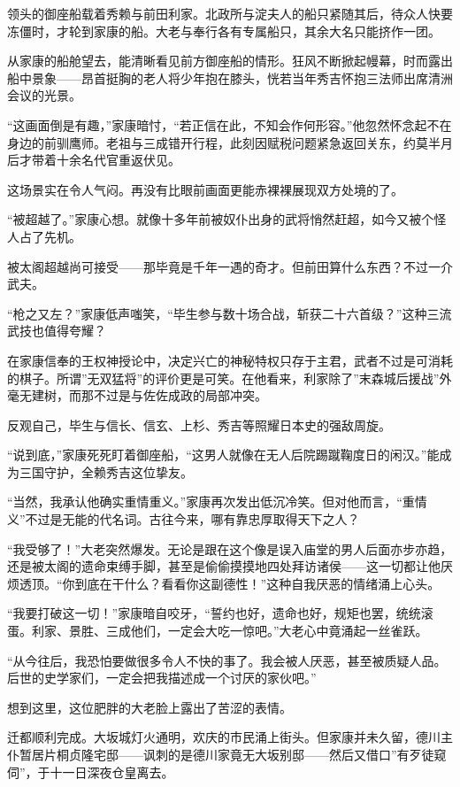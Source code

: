 \documentclass[
]{article}
\begin{document}
领头的御座船载着秀赖与前田利家。北政所与淀夫人的船只紧随其后，待众人快要冻僵时，才轮到家康的船。大老与奉行各有专属船只，其余大名只能挤作一团。

从家康的船舱望去，能清晰看见前方御座船的情形。狂风不断掀起幔幕，时而露出船中景象------昂首挺胸的老人将少年抱在膝头，恍若当年秀吉怀抱三法师出席清洲会议的光景。

``这画面倒是有趣，''家康暗忖，``若正信在此，不知会作何形容。''他忽然怀念起不在身边的前驯鹰师。老祖与三成错开行程，此刻因赋税问题紧急返回关东，约莫半月后才带着十余名代官重返伏见。

这场景实在令人气闷。再没有比眼前画面更能赤裸裸展现双方处境的了。

``被超越了。''家康心想。就像十多年前被奴仆出身的武将悄然赶超，如今又被个怪人占了先机。

被太阁超越尚可接受------那毕竟是千年一遇的奇才。但前田算什么东西？不过一介武夫。

``枪之又左？''家康低声嗤笑，``毕生参与数十场合战，斩获二十六首级？''这种三流武技也值得夸耀？

在家康信奉的王权神授论中，决定兴亡的神秘特权只存于主君，武者不过是可消耗的棋子。所谓''无双猛将''的评价更是可笑。在他看来，利家除了''末森城后援战''外毫无建树，而那不过是与佐佐成政的局部冲突。

反观自己，毕生与信长、信玄、上杉、秀吉等照耀日本史的强敌周旋。

``说到底，''家康死死盯着御座船，``这男人就像在无人后院踢蹴鞠度日的闲汉。''能成为三国守护，全赖秀吉这位挚友。

``当然，我承认他确实重情重义。''家康再次发出低沉冷笑。但对他而言，``重情义''不过是无能的代名词。古往今来，哪有靠忠厚取得天下之人？

``我受够了！''大老突然爆发。无论是跟在这个像是误入庙堂的男人后面亦步亦趋，还是被太阁的遗命束缚手脚，甚至是偷偷摸摸地四处拜访诸侯------这一切都让他厌烦透顶。``你到底在干什么？看看你这副德性！''这种自我厌恶的情绪涌上心头。

``我要打破这一切！''家康暗自咬牙，``誓约也好，遗命也好，规矩也罢，统统滚蛋。利家、景胜、三成他们，一定会大吃一惊吧。''大老心中竟涌起一丝雀跃。

``从今往后，我恐怕要做很多令人不快的事了。我会被人厌恶，甚至被质疑人品。后世的史学家们，一定会把我描述成一个讨厌的家伙吧。''

想到这里，这位肥胖的大老脸上露出了苦涩的表情。

迁都顺利完成。大坂城灯火通明，欢庆的市民涌上街头。但家康并未久留，德川主仆暂居片桐贞隆宅邸------讽刺的是德川家竟无大坂别邸------然后又借口''有歹徒窥伺''，于十一日深夜仓皇离去。
\end{document}
